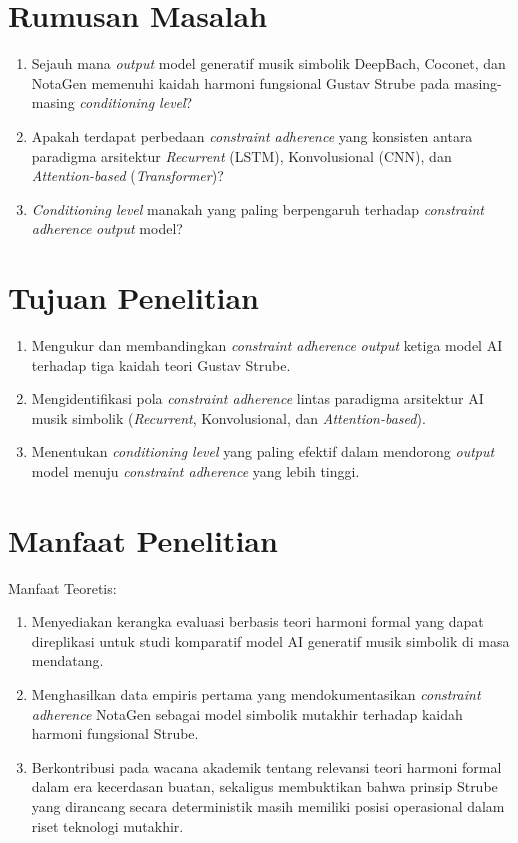 \section{Rumusan Masalah}

\begin{enumerate}
    \item Sejauh mana \textit{output} model generatif musik simbolik DeepBach, Coconet, dan NotaGen memenuhi kaidah harmoni fungsional Gustav Strube pada masing-masing \textit{conditioning level}?
    \item Apakah terdapat perbedaan \textit{constraint adherence} yang konsisten antara paradigma arsitektur \textit{Recurrent} (LSTM), Konvolusional (CNN), dan \textit{Attention-based} (\textit{Transformer})?
    \item \textit{Conditioning level} manakah yang paling berpengaruh terhadap \textit{constraint adherence} \textit{output} model?
\end{enumerate}

\section{Tujuan Penelitian}

\begin{enumerate}
    \item Mengukur dan membandingkan \textit{constraint adherence} \textit{output} ketiga model AI terhadap tiga kaidah teori Gustav Strube.
    \item Mengidentifikasi pola \textit{constraint adherence} lintas paradigma arsitektur AI musik simbolik (\textit{Recurrent}, Konvolusional, dan \textit{Attention-based}).
    \item Menentukan \textit{conditioning level} yang paling efektif dalam mendorong \textit{output} model menuju \textit{constraint adherence} yang lebih tinggi.
\end{enumerate}

\section{Manfaat Penelitian}

Manfaat Teoretis:
\begin{enumerate}
    \item Menyediakan kerangka evaluasi berbasis teori harmoni formal yang dapat direplikasi untuk studi komparatif model AI generatif musik simbolik di masa mendatang.
    \item Menghasilkan data empiris pertama yang mendokumentasikan \textit{constraint adherence} NotaGen sebagai model simbolik mutakhir terhadap kaidah harmoni fungsional Strube.
    \item Berkontribusi pada wacana akademik tentang relevansi teori harmoni formal dalam era kecerdasan buatan, sekaligus membuktikan bahwa prinsip Strube yang dirancang secara deterministik masih memiliki posisi operasional dalam riset teknologi mutakhir.
\end{enumerate}

